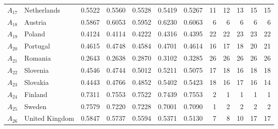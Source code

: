 \documentclass[5p,times]{elsarticle}
\begin{document}
\begin{table}[ht!]
{\begin{tabular}{llrrrrrrrrrr}
$A_{17}$ & Netherlands & 0.5522 & 0.5560 & 0.5528 & 0.5419 & 0.5267 & 11 & 12 & 13 & 15 & 15 \\
$A_{18}$ & Austria & 0.5867 & 0.6053 & 0.5952 & 0.6230 & 0.6063 & 6 & 6 & 6 & 6 & 6 \\
$A_{19}$ & Poland & 0.4124 & 0.4114 & 0.4222 & 0.4316 & 0.4395 & 22 & 22 & 23 & 23 & 22 \\
$A_{20}$ & Portugal & 0.4615 & 0.4748 & 0.4584 & 0.4701 & 0.4614 & 16 & 17 & 18 & 20 & 21 \\
$A_{21}$ & Romania & 0.2643 & 0.2638 & 0.2870 & 0.3102 & 0.3285 & 26 & 26 & 26 & 26 & 26 \\
$A_{22}$ & Slovenia & 0.4546 & 0.4744 & 0.5012 & 0.5211 & 0.5075 & 17 & 18 & 16 & 18 & 18 \\
$A_{23}$ & Slovakia & 0.4443 & 0.4766 & 0.4852 & 0.5402 & 0.5423 & 18 & 16 & 17 & 16 & 14 \\
$A_{24}$ & Finland & 0.7311 & 0.7553 & 0.7522 & 0.7439 & 0.7553 & 2 & 1 & 1 & 1 & 1 \\
$A_{25}$ & Sweden & 0.7579 & 0.7220 & 0.7228 & 0.7001 & 0.7090 & 1 & 2 & 2 & 2 & 2 \\
$A_{26}$ & United Kingdom & 0.5847 & 0.5737 & 0.5594 & 0.5371 & 0.5130 & 7 & 8 & 10 & 17 & 17 \\ \bottomrule
\end{tabular}
}
\end{table}
\end{document}
